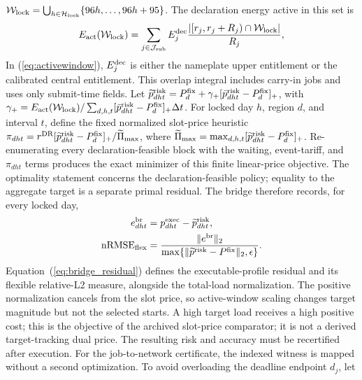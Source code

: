 \documentclass[10pt,journal]{IEEEtran}
\newcommand{\dt}{\Delta t}
\begin{document}
$\mathcal W_{\rm lock}=\bigcup_{h\in\mathcal H_{\rm lock}}
\{96h,\ldots,96h+95\}$. The declaration energy active in this set is
\begin{equation}
 E_{\rm act}(\mathcal W_{\rm lock})=
 \sum_{j\in\mathcal J_{\rm sub}}E_j^{\rm dec}
 \frac{|[r_j,r_j+R_j)\cap\mathcal W_{\rm lock}|}{R_j},
 \label{eq:activewindow}
\end{equation}
In (\ref{eq:activewindow}), $E_j^{\rm dec}$ is either the nameplate upper entitlement or the
calibrated central entitlement. This overlap integral includes carry-in jobs
and uses only submit-time fields. Let
$\widetilde p^{\rm risk}_{dht}=P_d^{\rm fix}+\gamma_+[\bar p^{\rm risk}_{dht}-P_d^{\rm fix}]_+$,
with $\gamma_+=E_{\rm act}(\mathcal W_{\rm lock})/\sum_{d,h,t}
[\bar p^{\rm risk}_{dht}-P_d^{\rm fix}]_+\dt$. For locked day $h$, region
$d$, and interval $t$, define the fixed normalized slot-price heuristic
$\pi_{dht}=r^{\rm DR}[\widetilde p^{\rm risk}_{dht}-P_d^{\rm fix}]_+ /
\widetilde\Pi_{\max}$, where $\widetilde\Pi_{\max}=\max_{d,h,t}
[\widetilde p^{\rm risk}_{dht}-P_d^{\rm fix}]_+$. Re-enumerating every
declaration-feasible block with the waiting, event-tariff, and $\pi_{dht}$
terms produces the exact minimizer of this finite linear-price objective. The
optimality statement concerns the declaration-feasible policy; equality to the
aggregate target is a separate primal residual. The bridge therefore records,
for every locked day,
\begin{equation}
 \begin{aligned}
 e^{\rm br}_{dht}&=p^{\rm exec}_{dht}-\widetilde p^{\rm risk}_{dht},\\
 \mathrm{nRMSE}_{\rm flex}&=
 \frac{\|e^{\rm br}\|_2}{\max\{\|\widetilde p^{\rm risk}-P^{\rm fix}\|_2,\epsilon\}}.
 \end{aligned}
 \label{eq:bridge_residual}
\end{equation}
Equation~(\ref{eq:bridge_residual}) defines the executable-profile residual and
its flexible relative-L2 measure, alongside the total-load normalization.
The positive normalization cancels from the slot price, so active-window
scaling changes target magnitude but not the selected starts. A high target
load receives a high positive cost; this is the objective of the archived slot-price comparator; it is not a
derived target-tracking dual price. The resulting risk and accuracy must be
recertified after execution.
For the job-to-network certificate, the indexed witness is mapped without a
second optimization. To avoid overloading the deadline endpoint $d_j$, let
\end{document}
